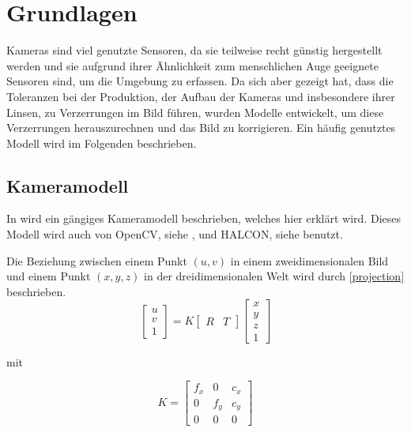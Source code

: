 \chapter{Grundlagen}
\label{chap:grundlagen}
Kameras sind viel genutzte Sensoren, da sie teilweise recht günstig hergestellt werden und sie aufgrund ihrer Ähnlichkeit zum menschlichen Auge geeignete Sensoren sind, um die Umgebung zu erfassen. Da sich aber gezeigt hat, dass die Toleranzen bei der Produktion, der Aufbau der Kameras und insbesondere ihrer Linsen, zu Verzerrungen im Bild führen, wurden Modelle entwickelt, um diese Verzerrungen herauszurechnen und das Bild zu korrigieren. Ein häufig genutztes Modell wird im Folgenden beschrieben.

\section{Kameramodell} %
\label{sec:kameramodell}
In \cite{Zhang} wird ein gängiges Kameramodell beschrieben, welches hier erklärt wird. Dieses Modell wird auch von OpenCV, siehe \cite{opencv}, und HALCON, siehe \cite{halcon} benutzt.

Die Beziehung zwischen einem Punkt $(u, v)$ in einem zweidimensionalen Bild und einem Punkt $(x, y, z)$ in der dreidimensionalen Welt wird durch \autoref{projection} beschrieben.
\newpage
\begin{equation}
\begin{bmatrix}
 	u \\
 	v \\
 	1
\end{bmatrix} = K 
\begin{bmatrix}
   	R & T
\end{bmatrix} 
\begin{bmatrix}
   	x \\
   	y \\
   	z \\
   	1
\end{bmatrix} \label{projection}
\end{equation}

mit 

\begin{equation}
  K = 
  \begin{bmatrix}
  	f_x & 0 & c_x \\
  	0 & f_y & c_y \\
  	0 & 0 & 0
  \end{bmatrix}
\end{equation}

